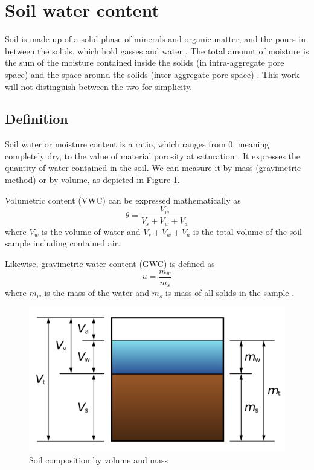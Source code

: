 \section{Soil water content}
Soil is made up of a solid phase of minerals and organic matter, and the pours in-between the solids, which hold gasses and water \cite{paul_soil_2007}. The total amount of moisture is the sum of the moisture contained inside the solids (in intra-aggregate pore space) and the space around the solids (inter-aggregate pore space) \cite{myjove_corporation_determination_2024}. This work will not distinguish between the two for simplicity.

\subsection{Definition}
Soil water or moisture content is a ratio, which ranges from 0, meaning completely dry, to the value of material porosity at saturation \cite{webster_humidity_1998}. It expresses the quantity of water contained in the soil. We can measure it by mass (gravimetric method) or by volume, as depicted in Figure \ref{fig:soil-phase-diagram}.

Volumetric content (VWC) can be expressed mathematically as
\begin{equation}
    \label{equation:volumetric-content} \theta = \dfrac{V_w}{V_s + V_w + V_a}
\end{equation}
where $V_w$ is the volume of water and $V_s + V_w + V_a$ is the total volume of the soil sample including contained air. 

Likewise, gravimetric water content (GWC) is defined as
\begin{equation}
    \label{equation:gravimetric-content} u = \dfrac{m_w}{m_s}
\end{equation}
where $m_w$ is the mass of the water and $m_s$ is mass of all solids in the sample \cite{edaphic_scientific_pty_ltd_how_2024}.

\begin{figure}
    \includegraphics[width=.5\textwidth]{fig/soil-phase-diagram.png}
    \caption{\label{fig:soil-phase-diagram} Soil composition by volume and mass \cite{noauthor_water_2023}}
\end{figure}

